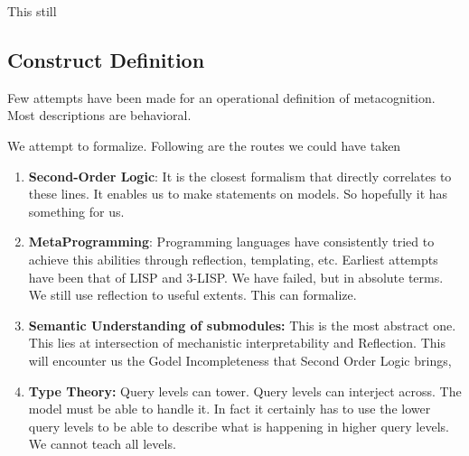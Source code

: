 \documentclass{article}
\begin{document}
This still

\subsection{Construct Definition}
%

Few attempts have been made for an operational definition of metacognition.
Most descriptions are behavioral.


We attempt to formalize. Following are the routes we could have taken
\begin{enumerate}
	\item \textbf{Second-Order Logic}: It is the closest formalism that directly correlates
	      to these lines. It enables us to make statements on models. So hopefully it
	      has something for us.
	\item \textbf{MetaProgramming}: Programming languages have consistently tried to
	      achieve this abilities through reflection, templating, etc. Earliest
	      attempts have been that of LISP and 3-LISP. We have failed, but in absolute
	      terms. We still use reflection to useful extents. This can formalize.
	\item \textbf{Semantic Understanding of submodules:} This is the most abstract one.
	      This lies at intersection of mechanistic interpretability and Reflection.
	      This will encounter us the Godel Incompleteness that Second Order Logic
	      brings,

	\item \textbf{Type Theory:} Query levels can tower. Query levels can
	      interject across. The model must be able to handle it. In fact
	      it certainly has to use the lower query levels to be able to
	      describe what is happening in higher query levels. We cannot
	      teach all levels.
\end{enumerate}

\end{document}
